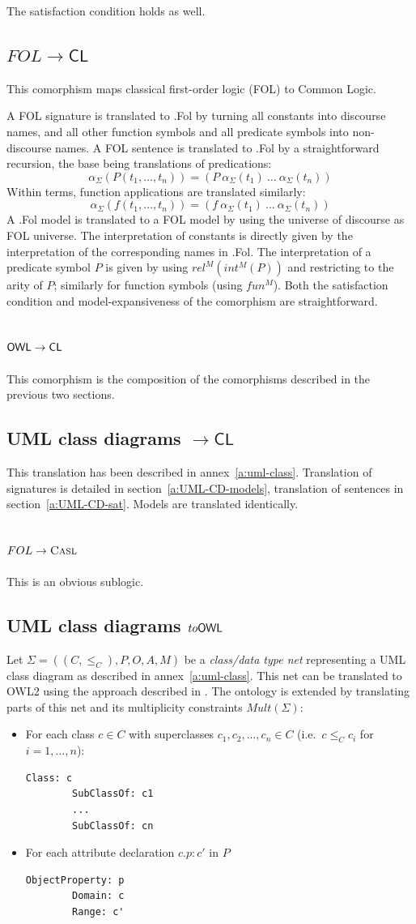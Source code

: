 \documentclass[10pt,fleqn,final]{scrreprt}
\newcommand*{\CL}{\ensuremath{\mathsf{CL}}\xspace}
\newcommand{\ssclause}[1]{\subsection{#1}}
\newenvironment{definitions}[0]{\medskip }{}
\begin{document}
\begin{definitions}
	The satisfaction condition holds as well.

\ssclause{$FOL \rightarrow \CL$}

This comorphism  maps classical first-order logic (FOL) to Common Logic.


A FOL signature is translated to \Clogic.Fol by turning all constants
into discourse names, and all other function symbols and all predicate
symbols into non-discourse names. A FOL sentence is translated
to \Clogic.Fol by a straightforward recursion, the base being translations
of predications:
$$\alpha_\Sigma(P(t_1,\ldots,t_n)) = (P\ \alpha_\Sigma(t_1)\ \ldots\ \alpha_\Sigma(t_n))$$
Within terms, function applications are translated similarly:
$$\alpha_\Sigma(f(t_1,\ldots,t_n)) = (f\ \alpha_\Sigma(t_1)\ \ldots\ \alpha_\Sigma(t_n))$$
A \Clogic.Fol model is translated to a FOL model by using the universe of
discourse as FOL universe. The interpretation of constants is
directly given by the interpretation of the corresponding names
in \Clogic.Fol. The interpretation of a predicate symbol $P$ is given
by using $rel^M(int^M(P))$ and restricting to the arity of $P$;
similarly for function symbols (using $fun^M$). Both the satisfaction condition
and model-expansiveness of the comorphism are straightforward.

\ssclause{$\OWL \rightarrow \CL$}

This comorphism is the composition of the comorphisms described in the previous
two sections.

\ssclause{UML class diagrams $\to \CL$}
This translation has been described in annex~\ref{a:uml-class}. 
Translation of signatures is detailed in section~\ref{a:UML-CD-models},
translation of sentences in section~\ref{a:UML-CD-sat}.
Models are translated identically.

\ssclause{$FOL \to \textmd{\textsc{Casl}}$}
This is an obvious sublogic.

 

\ssclause{UML class diagrams $to \mathsf{OWL}$}
Let $\Sigma = ((C, {\leq_C}), P, O, A, M)$ be a \emph{class/data type net} representing a UML class diagram as described in annex~\ref{a:uml-class}. This net can be translated to OWL2 using the approach described in \cite{zedlitz2012uml}.
The ontology is extended by translating parts of this net and its multiplicity constraints $\mathit{Mult}(\Sigma)$:
\begin{itemize}
\item For each class $c \in C$ with superclasses $c_1,c_2,...,c_n \in C$ (i.e.\ $c \leq_C c_i$ for $i=1,...,n$):
\begin{lstlisting}[language=owl2Manchester]
	Class: c
		SubClassOf: c1
		...
		SubClassOf: cn
\end{lstlisting}
\item For each attribute declaration $c.p:c'$ in $P$
\begin{lstlisting}[language=owl2Manchester]
	ObjectProperty: p
		Domain: c
		Range: c'
\end{lstlisting}


\end{itemize}
\end{definitions}
\end{document}
